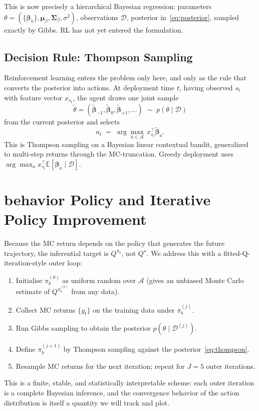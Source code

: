 \documentclass[11pt]{article}
\newcommand{\E}{\mathbb{E}}
\newcommand{\D}{\mathcal{D}}
\begin{document}
\medskip
This is now precisely a hierarchical Bayesian regression: parameters $\theta = (\{\bm\beta_a\}, \bm\mu_\beta, \bm\Sigma_\beta, \sigma^2)$, observations $\D$, posterior in~\eqref{eq:posterior}, sampled exactly by Gibbs. RL has not yet entered the formulation.

\subsection{Decision Rule: Thompson Sampling}
\label{sec:thompson}

Reinforcement learning enters the problem only here, and only as the rule that converts the posterior into actions. At deployment time $t$, having observed $s_t$ with feature vector $x_{s_t}$, the agent draws one joint sample
\[
\tilde\theta = (\tilde{\bm\beta}_{-1}, \tilde{\bm\beta}_0, \tilde{\bm\beta}_{+1}, \dots) \;\sim\; p(\theta \mid \D)
\]
from the current posterior and selects
\begin{equation}
\label{eq:thompson}
a_t \;=\; \arg\max_{a \in \mathcal{A}} \, x_{s_t}^\top \tilde{\bm\beta}_a.
\end{equation}
This is Thompson sampling on a Bayesian linear contextual bandit, generalized to multi-step returns through the MC-truncation. Greedy deployment uses $\arg\max_a x_{s_t}^\top \E[\bm\beta_a \mid \D]$.

\section{behavior Policy and Iterative Policy Improvement}
\label{sec:behavior}

Because the MC return depends on the policy that generates the future trajectory, the inferential target is $Q^{\pi_b}$, not $Q^\star$. We address this with a fitted-Q-iteration-style outer loop:
\begin{enumerate}[leftmargin=*]
\item Initialise $\pi_b^{(0)}$ as uniform random over $\mathcal{A}$ (gives an unbiased Monte Carlo estimate of $Q^{\pi_b^{(0)}}$ from any data).
\item Collect MC returns $\{y_t\}$ on the training data under $\pi_b^{(j)}$.
\item Run Gibbs sampling to obtain the posterior $p(\theta \mid \D^{(j)})$.
\item Define $\pi_b^{(j+1)}$ by Thompson sampling against the posterior~\eqref{eq:thompson}.
\item Resample MC returns for the next iteration; repeat for $J = 5$ outer iterations.
\end{enumerate}
This is a finite, stable, and statistically interpretable scheme: each outer iteration is a complete Bayesian inference, and the convergence behavior of the action distribution is itself a quantity we will track and plot.
\end{document}
